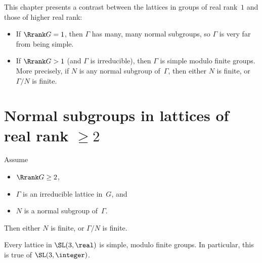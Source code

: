 

\label{NormalSubgroupChap}



This chapter presents a contrast between the lattices in groups of real rank~$1$ and those of higher real rank:
\begin{itemize}
\item If $\Rrank G = 1$, then $\Gamma$ has many, many normal subgroups, so $\Gamma$ is very far from being simple.
\item If $\Rrank G > 1$ (and $\Gamma$ is irreducible), then $\Gamma$ is simple modulo finite groups. More precisely, if $N$ is any normal subgroup of~$\Gamma$, then either $N$ is finite, or $\Gamma/N$ is finite.
\end{itemize}









\section{\texorpdfstring{Normal subgroups in lattices of real rank $\ge 2$}{Normal subgroups in lattices of real rank at least two}}

\begin{thm} \label{MargNormalSubgrpsThm}
Assume 
\noprelistbreak
	\begin{itemize}
	\item $\Rrank G \ge 2$,
	\item $\Gamma$ is an irreducible lattice in~$G$,
	and
	\item $N$ is a normal subgroup of\/~$\Gamma$.
	\end{itemize}
Then either $N$ is finite, or\/ $\Gamma/N$ is finite.
\end{thm}

\begin{eg}
Every lattice in $\SL(3,\real)$ is simple, modulo finite groups.
In particular, this is true of $\SL(3,\integer)$.
\end{eg}


